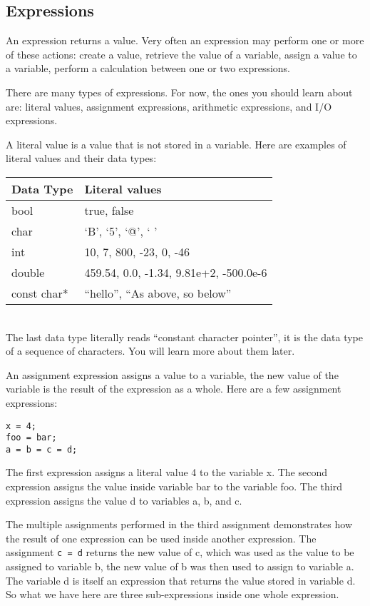 \documentclass[a4paper,12pt]{article}
\begin{document}
\subsection*{Expressions}

An expression returns a value. Very often an expression may perform one or more of these actions: create a value, retrieve the value of a variable, assign a value to a variable, perform a calculation between one or two expressions. 

There are many types of expressions. For now, the ones you should learn about are: literal values, assignment expressions, arithmetic expressions, and I/O expressions. 

A literal value is a value that is not stored in a variable. Here are examples of literal values and their data types: \\

\begin{tabular}{|l|l|}
\hline
Data Type & Literal values \\
\hline
bool & true, false \\
\hline
char & `B', `5', `@', ` ' \\
\hline
int & 10, 7, 800, -23, 0, -46 \\
\hline
double & 459.54, 0.0, -1.34, 9.81e+2, -500.0e-6 \\
\hline
const char* & ``hello'', ``As above, so below'' \\
\hline
\end{tabular} \\

The last data type literally reads ``constant character pointer'', it is the data type of a sequence of characters. You will learn more about them later.

An assignment expression assigns a value to a variable, the new value of the variable is the result of the expression as a whole. Here are a few assignment expressions:

\begin{lstlisting}[caption=Examples of assignment expressions]
x = 4;
foo = bar;
a = b = c = d;
\end{lstlisting}

The first expression assigns a literal value 4 to the variable x. The second expression assigns the value inside variable bar to the variable foo. The third expression assigns the value d to variables a, b, and c. 


The multiple assignments performed in the third assignment demonstrates how the result of one expression can be used inside another expression. The assignment \texttt{c = d} returns the new value of c, which was used as the value to be assigned to variable b, the new value of b was then used to assign to variable a. The variable d is itself an expression that returns the value stored in variable d. So what we have here are three sub-expressions inside one whole expression.
\end{document}

